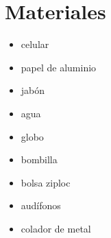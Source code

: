\documentclass[a4paper,12pt]{article}
\begin{document}
   






\section*{Materiales}
\begin{multicols}{2}
\begin{itemize}
    \item celular
    \item papel de aluminio
    \item jabón
    \item agua
    \item globo
    \item bombilla
    \item bolsa ziploc
    \item audífonos
    \item colador de metal 
\end{itemize}
\end{multicols}


\end{document}
